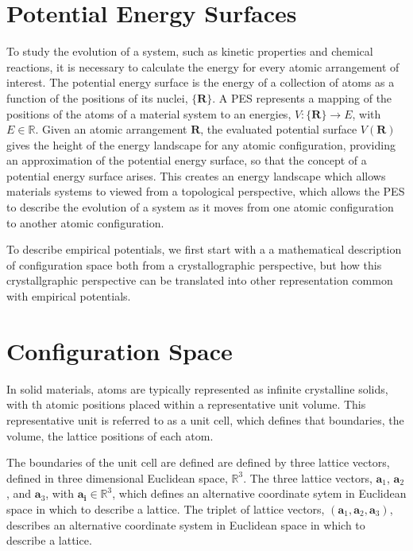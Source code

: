 \section{Potential Energy Surfaces}

To study the evolution of a system, such as kinetic properties and chemical reactions, it is necessary to calculate the energy for every atomic arrangement of interest.  The potential energy surface is the energy of a collection of atoms as a function of the positions of its nuclei, $\{\bm{R}\}$.
A PES represents a mapping of the positions of the atoms of a material system to an energies, $V:\{\bm{R}\}\rightarrow E$, with $E\in\mathbb{R}$.
Given an atomic arrangement $\bm{R}$, the evaluated potential surface $V(\bm{R})$ gives the height of the energy landscape for any atomic configuration, providing an approximation of the potential energy surface, so that the concept of a potential energy surface arises.
This creates an energy landscape which allows materials systems to viewed from a topological perspective, which allows the PES to describe the evolution of a system as it moves from one atomic configuration to another atomic configuration.

To describe empirical potentials, we first start with a a mathematical description of configuration space both from a crystallographic perspective, but how this crystallgraphic perspective can be translated into other representation common with empirical potentials.

\section{Configuration Space}
In solid materials, atoms are typically represented as infinite crystalline solids, with th atomic positions placed within a representative unit volume.
This representative unit is referred to as a unit cell, which defines that boundaries, the volume, the lattice positions of each atom.

The boundaries of the unit cell are defined are defined by three lattice vectors, defined in three dimensional Euclidean space, $\mathbb{R}^3$.
The three lattice vectors, $\bm{a}_1$, $\bm{a}_2$, and $\bm{a}_3$, with $\bm{a_i}\in\mathbb{R}^3$, which defines an alternative coordinate sytem in Euclidean space in which to describe a lattice.
The triplet of lattice vectors, $(\bm{a}_1,\bm{a}_2,\bm{a}_3)$, describes an alternative coordinate system in Euclidean space in which to describe a lattice.

